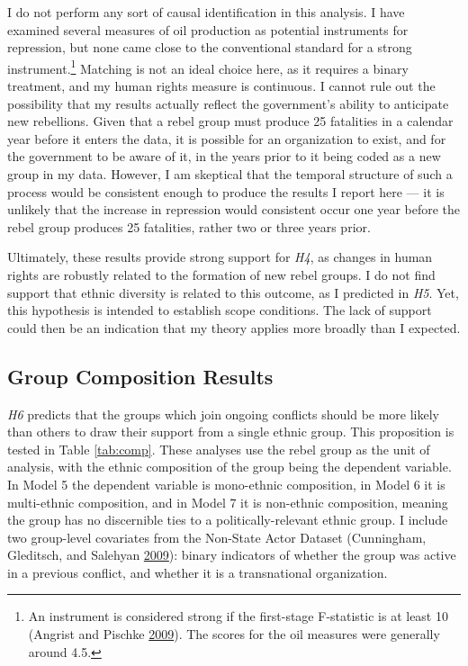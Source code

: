 \documentclass[12pt,]{book}
\let\rmarkdownfootnote\footnote%
\def\footnote{\protect\rmarkdownfootnote}
\theoremstyle{definition}
\theoremstyle{definition}
\theoremstyle{definition}
\theoremstyle{remark}
\begin{document}
I do not perform any sort of causal identification in this analysis. I
have examined several measures of oil production as potential
instruments for repression, but none came close to the conventional
standard for a strong instrument.\footnote{An instrument is considered
  strong if the first-stage F-statistic is at least 10 (Angrist and
  Pischke \protect\hyperlink{ref-Angrist2009}{2009}). The scores for the
  oil measures were generally around 4.5.} Matching is not an ideal
choice here, as it requires a binary treatment, and my human rights
measure is continuous. I cannot rule out the possibility that my results
actually reflect the government's ability to anticipate new rebellions.
Given that a rebel group must produce 25 fatalities in a calendar year
before it enters the data, it is possible for an organization to exist,
and for the government to be aware of it, in the years prior to it being
coded as a new group in my data. However, I am skeptical that the
temporal structure of such a process would be consistent enough to
produce the results I report here --- it is unlikely that the increase
in repression would consistent occur one year before the rebel group
produces 25 fatalities, rather two or three years prior.

Ultimately, these results provide strong support for \emph{H4}, as
changes in human rights are robustly related to the formation of new
rebel groups. I do not find support that ethnic diversity is related to
this outcome, as I predicted in \emph{H5}. Yet, this hypothesis is
intended to establish scope conditions. The lack of support could then
be an indication that my theory applies more broadly than I expected.

\hypertarget{group-composition-results}{%
\subsection{Group Composition Results}\label{group-composition-results}}

\emph{H6} predicts that the groups which join ongoing conflicts should
be more likely than others to draw their support from a single ethnic
group. This proposition is tested in Table \ref{tab:comp}. These
analyses use the rebel group as the unit of analysis, with the ethnic
composition of the group being the dependent variable. In Model 5 the
dependent variable is mono-ethnic composition, in Model 6 it is
multi-ethnic composition, and in Model 7 it is non-ethnic composition,
meaning the group has no discernible ties to a politically-relevant
ethnic group. I include two group-level covariates from the Non-State
Actor Dataset (Cunningham, Gleditsch, and Salehyan
\protect\hyperlink{ref-Cunningham2009}{2009}): binary indicators of
whether the group was active in a previous conflict, and whether it is a
transnational organization.
\end{document}

